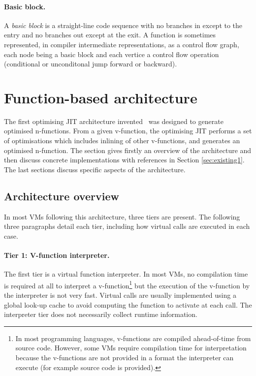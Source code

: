 \documentclass[a4paper,12pt,twoside]{../includes/ThesisStyle}
\begin{document}

\paragraph{Basic block.} A \emph{basic block} is a straight-line code sequence with no branches in except to the entry and no branches out except at the exit. A function is sometimes represented, in compiler intermediate representations, as a control flow graph, each node being a basic block and each vertice a control flow operation (conditional or unconditonal jump forward or backward).


\section{Function-based architecture}
\label{sec:architecture}

The first optimising JIT architecture invented~\cite{UrsPHD} was designed to generate optimised n-functions. From a given v-function, the optimising JIT performs a set of optimisations which includes inlining of other v-functions, and generates an optimised n-function. The section gives firstly an overview of the architecture and then discuss concrete implementations with references in Section \ref{sec:existing1}. The last sections discuss specific aspects of the architecture.

\subsection{Architecture overview}

In most VMs following this architecture, three tiers are present. The following three paragraphs detail each tier, including how virtual calls are executed in each case.

\paragraph{Tier 1: V-function interpreter. } The first tier is a virtual function interpreter. In most VMs, no compilation time is required at all to interpret a v-function\footnote{In most programming languages, v-functions are compiled ahead-of-time from source code. However, some VMs require compilation time for interpretation because the v-functions are not provided in a format the interpreter can execute (for example source code is provided).} but the execution of the v-function by the interpreter is not very fast. Virtual calls are usually implemented using a global look-up cache to avoid computing the function to activate at each call. The interpreter tier does not necessarily collect runtime information. 
\end{document}
